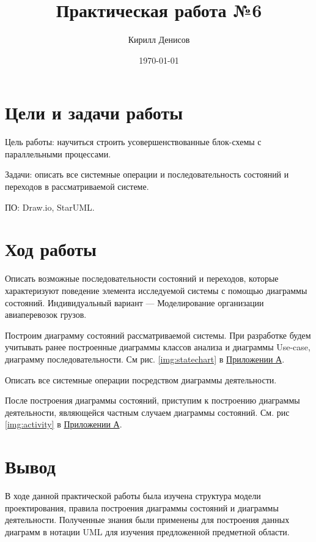\documentclass[a4paper,14pt]{extarticle}
\author{Кирилл Денисов}
\title{Практическая работа №6}
\date{\today}
\newcommand{\pathToCommonFolder}{/home/denilai/Desktop/LaTeX/Common}
\begin{document}
\thispagestyle{empty}



\newpage
\tableofcontents
\newpage	
\section{Цели и задачи работы}
Цель работы: научиться строить усовершенствованные блок-схемы с
параллельными процессами.

Задачи: описать все системные операции и последовательность состояний и
переходов в рассматриваемой системе.

ПО: Draw.io, StarUML.

\section{Ход работы}
\begin{problem}
Описать возможные последовательности состояний и переходов, которые характеризуют поведение элемента исследуемой системы с помощью
диаграммы состояний. Индивидуальный вариант --- Моделирование организации авиаперевозок грузов.
\end{problem}
\begin{nonum}
Построим диаграмму состояний рассматриваемой системы. При разработке будем учитывать ранее построенные диаграммы классов анализа и диаграммы Use-case, диаграмму последовательности. См  рис. \ref {img:statechart} в \hyperref[sec:pril]{Приложении А}.

\normalsize
\end{nonum}
\begin{problem}
	Описать все системные операции посредством диаграммы деятельности.
\end{problem}

\begin{nonum}
	После построения диаграммы состояний, приступим к построению диаграммы деятельности, являющейся частным случаем диаграммы состояний. См. рис \ref{img:activity} в \hyperref[sec:pril]{Приложении А}.
\end{nonum}


\section{Вывод}
В ходе данной практической работы была изучена структура модели проектирования, правила построения диаграммы состояний и диаграммы деятельности. Полученные знания были применены для построения данных диаграмм в нотации UML для изучения предложенной предметной области.
\end{document}
